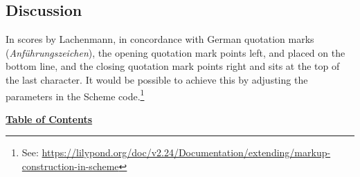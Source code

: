 \subsection{Discussion}

In scores by Lachenmann, in concordance with German quotation marks (\textit{Anführungszeichen}), the opening quotation mark points left, and placed on the bottom line, and the closing quotation mark points right and sits at the top of the last character. It would be possible to achieve this by adjusting the parameters in the Scheme code.\footnote{See: \url{https://lilypond.org/doc/v2.24/Documentation/extending/markup-construction-in-scheme}}

\hyperref[sec:toc]{\textbf{Table of Contents}}
\vfill \break


